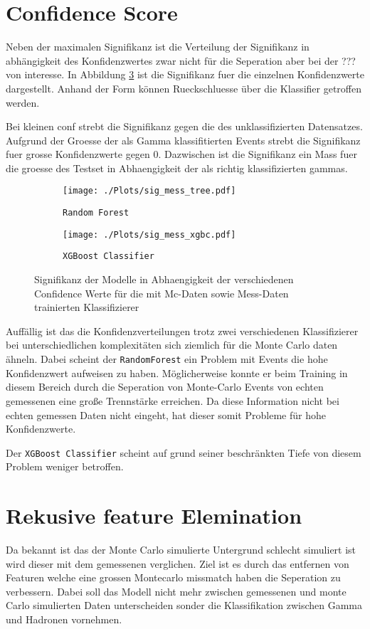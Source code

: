 \section{Confidence Score}
Neben der maximalen Signifikanz ist die Verteilung der Signifikanz in abhängigkeit des Konfidenzwertes zwar nicht für die Seperation aber bei der ??? von interesse. 
In Abbildung \ref{fig:signconf} ist die Signifikanz fuer die einzelnen Konfidenzwerte dargestellt. 
Anhand der Form können Rueckschluesse über die Klassifier getroffen werden. 

Bei kleinen conf strebt die Signifikanz gegen die des unklassifizierten Datensatzes.
Aufgrund der Groesse der als Gamma klassifitierten Events strebt die Signifikanz fuer grosse Konfidenzwerte gegen 0.
Dazwischen ist die Signifikanz ein Mass fuer die groesse des Testset in Abhaengigkeit der als richtig klassifizierten gammas.
\begin{figure}[H]
  \centering
  \begin{subfigure}[b]{0.48\textwidth}
  \centering
  \texttt{[image: ./Plots/sig\_mess\_tree.pdf]}
  \caption{\texttt{Random Forest}}
  \label{fig:signconfMC}
\end{subfigure}
\begin{subfigure}[b]{0.48\textwidth}
  \centering
  \texttt{[image: ./Plots/sig\_mess\_xgbc.pdf]}
  \caption{\texttt{XGBoost Classifier}}
  \label{fig:signconfMESS}
\end{subfigure}
\caption{Signifikanz der Modelle in Abhaengigkeit der verschiedenen Confidence Werte für die mit Mc-Daten sowie Mess-Daten trainierten Klassifizierer}
\label{fig:signconf}
\end{figure}

Auffällig ist das die Konfidenzverteilungen trotz zwei verschiedenen Klassifizierer bei unterschiedlichen komplexitäten sich ziemlich für die Monte Carlo daten ähneln.
Dabei scheint der \texttt{RandomForest} ein Problem mit Events die hohe Konfidenzwert aufweisen zu haben. 
Möglicherweise konnte er beim Training in diesem Bereich durch die Seperation von Monte-Carlo Events von echten gemessenen eine große Trennstärke erreichen. 
Da diese Information nicht bei echten gemessen Daten nicht eingeht, hat dieser somit Probleme für hohe Konfidenzwerte.

Der \texttt{XGBoost Classifier} scheint auf grund seiner beschränkten Tiefe von diesem Problem weniger betroffen. 

\section{Rekusive feature Elemination}
Da bekannt ist das der Monte Carlo simulierte Untergrund schlecht simuliert ist wird dieser mit dem gemessenen verglichen. 
Ziel ist es durch das entfernen von Featuren welche eine grossen Montecarlo missmatch haben die Seperation zu verbessern. 
Dabei soll das Modell nicht mehr zwischen gemessenen und monte Carlo simulierten Daten unterscheiden sonder die Klassifikation zwischen Gamma und Hadronen vornehmen.

